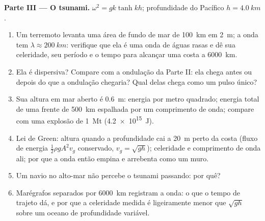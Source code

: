 \begin{problem}
\medskip
\noindent\textbf{Parte III --- O tsunami.}
$\omega^2 = gk\tanh kh$; profundidade do Pacífico $h = \qty{4.0}{km}$.
\begin{enumerate}[resume]
  \item Um terremoto levanta uma área de fundo de mar de \qty{100}{km} em
        \qty{2}{m}; a onda tem $\lambda \approx \qty{200}{km}$: verifique que ela é uma
        onda de águas rasas e dê sua celeridade, seu período e o tempo para
        alcançar uma costa a \qty{6000}{km}.
  \item Ela é dispersiva? Compare com a ondulação da Parte II: ela
        chega antes ou depois do que a ondulação chegaria? Qual delas chega como
        um pulso único?
  \item Sua altura em mar aberto é \qty{0.6}{m}: energia por metro quadrado;
        energia total de uma frente de \qty{500}{km} espalhada por um
        comprimento de onda; compare com uma explosão de \qty{1}{Mt} (\qty{4.2e15}{J}).
  \item Lei de Green: altura quando a profundidade cai a \qty{20}{m} perto da
        costa (fluxo de energia $\tfrac12\rho gA^2v_g$ conservado, $v_g = \sqrt{gh}$);
        celeridade e comprimento de onda ali; por que a onda então empina e
        arrebenta como um muro.
  \item Um navio no alto-mar não percebe o tsunami passando: por quê?
  \item Marégrafos separados por \qty{6000}{km} registram a onda: o que o
        tempo de trajeto dá, e por que a celeridade medida é ligeiramente
        menor que $\sqrt{gh}$ sobre um oceano de profundidade variável.
\end{enumerate}


\end{problem}
